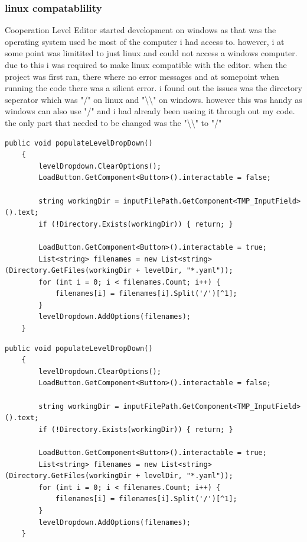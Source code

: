 \subsubsection{linux compatablility}
Cooperation Level Editor started development on windows as that was the operating system used be most of the computer i had access to. however, i at some point was limitited to just linux and could not access a windows computer. due to this i was required to make linux compatible with the editor. when the project was first ran, there where no error messages and at somepoint when running the code there was a silient error. i found out the issues was the directory seperator which was "/" on linux and "\textbackslash\textbackslash" on windows. however this was handy as windows can also use "/" and i had already been useing it through out my code. the only part that needed to be changed was the "\textbackslash\textbackslash" to "/"

\begin{minipage}{\textwidth}
\begin{lstlisting}[language={[Sharp]C}, caption=before '\textbackslash\textbackslash' changed to'/' , label=clst:beforeDIRChange]
    public void populateLevelDropDown()
    {
        levelDropdown.ClearOptions();
        LoadButton.GetComponent<Button>().interactable = false;
        
        string workingDir = inputFilePath.GetComponent<TMP_InputField>().text;
        if (!Directory.Exists(workingDir)) { return; }

        LoadButton.GetComponent<Button>().interactable = true;
        List<string> filenames = new List<string>(Directory.GetFiles(workingDir + levelDir, "*.yaml"));
        for (int i = 0; i < filenames.Count; i++) {
            filenames[i] = filenames[i].Split('/')[^1];
        }
        levelDropdown.AddOptions(filenames);
    }
\end{lstlisting}
\begin{lstlisting}[language={[Sharp]C}, caption=after '\textbackslash\textbackslash' changed to '/', label=clst:afterDIRChange]
    public void populateLevelDropDown()
    {
        levelDropdown.ClearOptions();
        LoadButton.GetComponent<Button>().interactable = false;
        
        string workingDir = inputFilePath.GetComponent<TMP_InputField>().text;
        if (!Directory.Exists(workingDir)) { return; }

        LoadButton.GetComponent<Button>().interactable = true;
        List<string> filenames = new List<string>(Directory.GetFiles(workingDir + levelDir, "*.yaml"));
        for (int i = 0; i < filenames.Count; i++) {
            filenames[i] = filenames[i].Split('/')[^1];
        }
        levelDropdown.AddOptions(filenames);
    }
\end{lstlisting}
\end{minipage}

